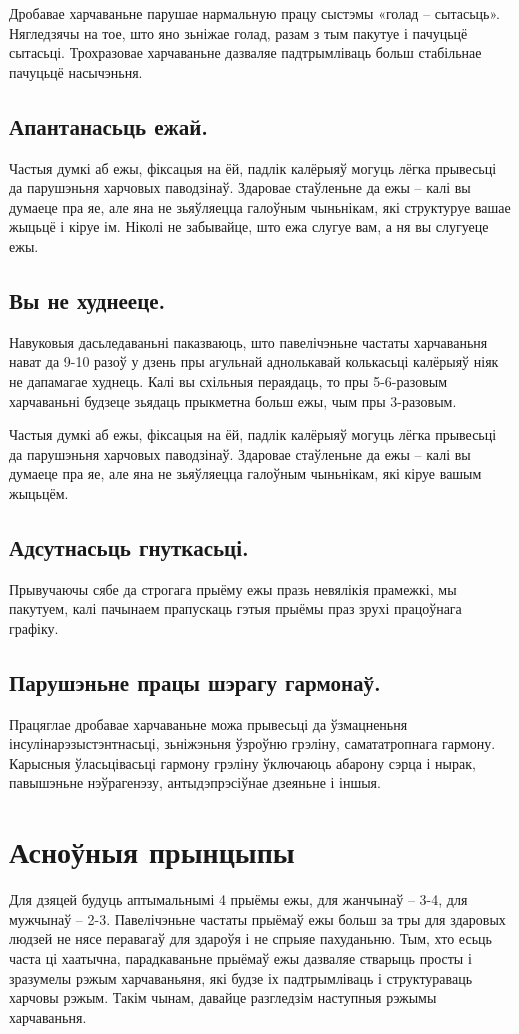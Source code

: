 Дробавае харчаваньне парушае нармальную працу сыстэмы «голад – сытасьць». Нягледзячы на тое, што яно зьніжае голад, разам з тым пакутуе і пачуцьцё сытасьці. Трохразовае харчаваньне дазваляе падтрымліваць больш стабільнае пачуцьцё насычэньня.

\subsection{Апантанасьць ежай.}
Частыя думкі аб ежы, фіксацыя на ёй, падлік калёрыяў могуць лёгка прывесьці да парушэньня харчовых паводзінаў. Здаровае стаўленьне да ежы – калі вы думаеце пра яе, але яна не зьяўляецца галоўным чыньнікам, які структуруе вашае жыцьцё і кіруе ім. Ніколі не забывайце, што ежа слугуе вам, а ня вы слугуеце ежы.

\subsection{Вы не худнееце.}
Навуковыя дасьледаваньні паказваюць, што павелічэньне частаты харчаваньня нават да 9-10 разоў у дзень пры агульнай аднолькавай колькасьці калёрыяў ніяк не дапамагае худнець. Калі вы схільныя пераядаць, то пры 5-6-разовым харчаваньні будзеце зьядаць прыкметна больш ежы, чым пры 3-разовым.

Частыя думкі аб ежы, фіксацыя на ёй, падлік калёрыяў могуць лёгка прывесьці да парушэньня харчовых паводзінаў. Здаровае стаўленьне да ежы – калі вы думаеце пра яе, але яна не зьяўляецца галоўным чыньнікам, які кіруе вашым жыцьцём.

\subsection{Адсутнасьць гнуткасьці.}
Прывучаючы сябе да строгага прыёму ежы празь невялікія прамежкі, мы пакутуем, калі пачынаем прапускаць гэтыя прыёмы праз зрухі працоўнага графіку.

\subsection{Парушэньне працы шэрагу гармонаў.}
Працяглае дробавае харчаваньне можа прывесьці да ўзмацненьня інсулінарэзыстэнтнасьці, зьніжэньня ўзроўню грэліну, самататропнага гармону. Карысныя ўласьцівасьці гармону грэліну ўключаюць абарону сэрца і нырак, павышэньне нэўрагенэзу, антыдэпрэсіўнае дзеяньне і іншыя.

\section{Асноўныя прынцыпы}
Для дзяцей будуць аптымальнымі 4 прыёмы ежы, для жанчынаў – 3-4, для мужчынаў – 2-3. Павелічэньне частаты прыёмаў ежы больш за тры для здаровых людзей не нясе перавагаў для здароўя і не спрыяе пахуданьню. Тым, хто есьць часта ці хаатычна, парадкаваньне прыёмаў ежы дазваляе стварыць просты і зразумелы рэжым харчаваньяня, які будзе іх падтрымліваць і структураваць харчовы рэжым. Такім чынам, давайце разгледзім наступныя рэжымы харчаваньня.

